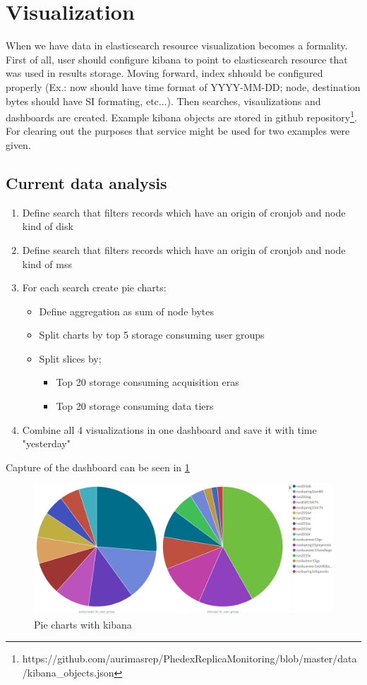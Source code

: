 \section{Visualization}

When we have data in elasticsearch resource visualization becomes a formality. First of all, user should configure kibana to point to elasticsearch resource that was used in results 
storage. Moving forward, index shhould be configured properly (Ex.: now should have time format of YYYY-MM-DD; node, destination bytes should have SI formating, etc...). Then searches, 
visaulizations and dashboards are created. Example kibana objects are stored in github 
repository\footnote{https://github.com/aurimasrep/PhedexReplicaMonitoring/blob/master/data/kibana{\_}objects.json}. For clearing out the purposes that service might be used for two examples 
were given.

\subsection{Current data analysis}

\begin{enumerate}
\item Define search that filters records which have an origin of cronjob and node kind of disk
\item Define search that filters records which have an origin of cronjob and node kind of mss
\item For each search create pie charts:
\begin{itemize}
\item Define aggregation as sum of node bytes
\item Split charts by top 5 storage consuming user groups
\item Split slices by;
\begin{itemize}
\item Top 20 storage consuming acquisition eras
\item Top 20 storage consuming data tiers
\end{itemize}
\end{itemize}
\item Combine all 4 visualizations in one dashboard and save it with time "yesterday"
\end{enumerate}
Capture of the dashboard can be seen in \ref{fig:pie-charts}
\begin{figure}[ht]
\begin{center}
\includegraphics[width=15cm]{pie-charts}
\caption{Pie charts with kibana}
\label{fig:pie-charts}
\end{center}
\end{figure}

